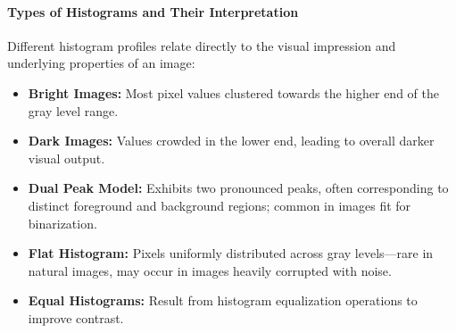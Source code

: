 \paragraph{Types of Histograms and Their Interpretation}
Different histogram profiles relate directly to the visual impression and underlying properties of an image:
\begin{itemize}
    \item \textbf{Bright Images:} Most pixel values clustered towards the higher end of the gray level range.
    \item \textbf{Dark Images:} Values crowded in the lower end, leading to overall darker visual output.
    \item \textbf{Dual Peak Model:} Exhibits two pronounced peaks, often corresponding to distinct foreground and background regions; common in images fit for binarization.
    \item \textbf{Flat Histogram:} Pixels uniformly distributed across gray levels—rare in natural images, may occur in images heavily corrupted with noise.
    \item \textbf{Equal Histograms:} Result from histogram equalization operations to improve contrast.
\end{itemize}


